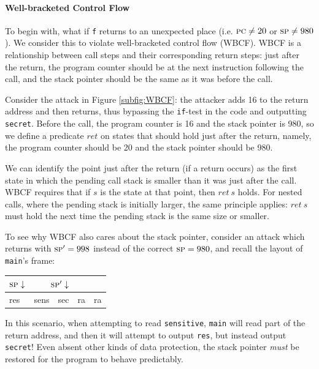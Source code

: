 \documentclass[10pt,conference]{ieeetran}%
\theoremstyle{definition}
\begin{document}
\paragraph*{Well-bracketed Control Flow}

To begin with, what if {\tt f} returns to an unexpected place (i.e. \(\textsc{pc} \neq 20\) or
\(\textsc{sp} \neq 980\)). We consider this to
violate well-bracketed control flow (WBCF). WBCF is a relationship between
call steps and their corresponding return steps: just after the return, the program
counter should be at the next instruction following the call,
and the stack pointer should be the same as it was before the call.

Consider the attack in Figure \ref{subfig:WBCF}: the attacker adds
16 to the return address and then returns, thus bypassing the {\tt if}-test in the code and outputting
{\tt secret}. Before the call, the program counter is 16 and the stack pointer is 980,
so we define a predicate \(ret\) 
on states that should hold just after the return, namely, the program counter
should be 20 and the stack pointer should be 980. 

We can identify the point just after the return (if a return occurs)
as the first state in which the pending call stack is smaller than it was
just after the call.
WBCF requires that if \(s\) is the state at that point, then \(ret ~ s\) holds.
For nested calls, where the pending stack is initially larger, the same principle
applies: \(ret ~ s\) must hold the next time the pending stack is the same size or smaller.

To see why WBCF also cares about the stack pointer, consider an attack  which
returns with \(\textsc{sp}' = 998\) instead of the correct \(\textsc{sp} = 980\), and recall
the layout of {\tt main}'s frame: 
\begin{tabular}{| l | l | l | l | l |}
  \multicolumn{1}{r}{\(\textsc{sp} \downarrow\)} &
  \multicolumn{2}{r}{\(\textsc{sp}' \downarrow\)} \\
  \hline
  res & sens & sec & ra & ra \\
  \hline
\end{tabular}

\vspace{\abovedisplayskip}

\noindent
In this scenario, when attempting to read {\tt sensitive}, {\tt main} will
read part of the return address, and then it will attempt to output
{\tt res}, but instead output {\tt secret}! Even absent other
kinds of data protection, the stack pointer {\it must} be restored
for the program to behave predictably.
\end{document}
